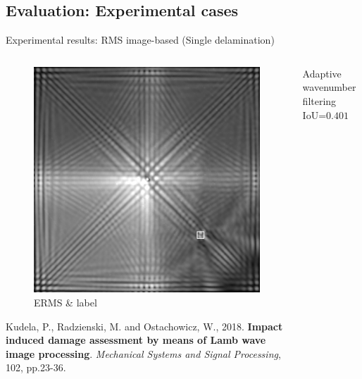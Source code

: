 \documentclass[10pt,aspectratio=169,dvipsnames]{beamer} %
\begin{document}
\subsection*{Evaluation: Experimental cases}	
\setcounter{subfigure}{0}		%
\begin{frame}{Experimental results: RMS image-based (Single delamination)}
	\begin{columns}[T]
		\begin{column}[t]{.25\textwidth}
			\begin{figure}[ht!]
				\centering
				\captionsetup{justification=centering}
				\includegraphics[height=.35\textheight]{ERMS_with_label.png}
				\caption{ERMS \& label}
			\end{figure}
			\justifying
			\tiny
			Kudela, P., Radzienski, M. and Ostachowicz, W., 2018. \textbf{Impact induced damage assessment by means of Lamb wave image processing}. \textit{Mechanical Systems and Signal Processing}, 102, pp.23-36.
		\end{column}
		\begin{column}[t]{0.5\textwidth}
			\begin{block}{Adaptive wavenumber filtering}
				\centering
				\footnotesize
				IoU=$0.401$
				\begin{figure}[ht!]
					\centering

\end{figure}
\end{block}
\end{column}
\end{columns}
\end{frame}
\end{document}
